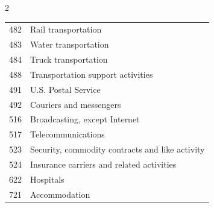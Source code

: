 {\begin{multicols}{2}
\begin{tabular}{ll}
482 & Rail transportation \\
483 & Water transportation \\
484 & Truck transportation \\
488 & Transportation support activities \\
491 & U.S. Postal Service \\
492 & Couriers and messengers \\
516 & Broadcasting, except Internet \\
517 & Telecommunications \\
523 & Security, commodity contracts and like activity \\
524 & Insurance carriers and related activities \\
622 & Hospitals \\
721 & Accommodation \\
\end{tabular}
\end{multicols}
}
